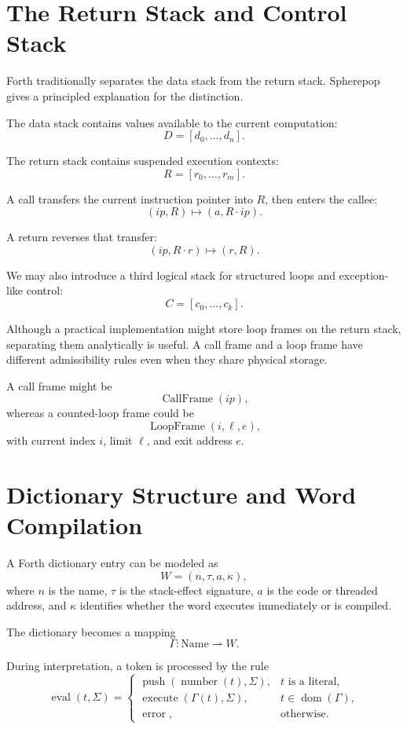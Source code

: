 \documentclass[12pt]{article}
\begin{document}
\section{The Return Stack and Control Stack}

Forth traditionally separates the data stack from the return stack. Spherepop gives a principled explanation for the distinction.

The data stack contains values available to the current computation:
\[
D = [d_0,\ldots,d_n].
\]

The return stack contains suspended execution contexts:
\[
R = [r_0,\ldots,r_m].
\]

A call transfers the current instruction pointer into \(R\), then enters the callee:
\[
(ip,R) \mapsto (a,R\cdot ip).
\]

A return reverses that transfer:
\[
(ip,R\cdot r) \mapsto (r,R).
\]

We may also introduce a third logical stack for structured loops and exception-like control:
\[
C=[c_0,\ldots,c_k].
\]

Although a practical implementation might store loop frames on the return stack, separating them analytically is useful. A call frame and a loop frame have different admissibility rules even when they share physical storage.

A call frame might be
\[
\operatorname{CallFrame}(ip),
\]
whereas a counted-loop frame could be
\[
\operatorname{LoopFrame}(i,\ell,e),
\]
with current index \(i\), limit \(\ell\), and exit address \(e\).

\section{Dictionary Structure and Word Compilation}

A Forth dictionary entry can be modeled as
\[
W=(n,\tau,a,\kappa),
\]
where \(n\) is the name, \(\tau\) is the stack-effect signature, \(a\) is the code or threaded address, and \(\kappa\) identifies whether the word executes immediately or is compiled.

The dictionary becomes a mapping
\[
\Gamma : \text{Name}\rightharpoonup W.
\]

During interpretation, a token is processed by the rule
\[
\operatorname{eval}(t,\Sigma)=
\begin{cases}
\operatorname{push}(\operatorname{number}(t),\Sigma), & t\text{ is a literal},\\
\operatorname{execute}(\Gamma(t),\Sigma), & t\in\operatorname{dom}(\Gamma),\\
\operatorname{error}, & \text{otherwise}.
\end{cases}
\]
\end{document}

